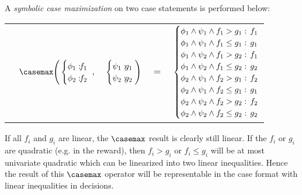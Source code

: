 A \emph{symbolic case maximization} on two case statements is performed below:
\vspace{-4mm}

{\footnotesize
\begin{center}
\begin{tabular}{r c c c l}
&
\hspace{-7mm} $\casemax \Bigg(
  \begin{cases}
    \phi_1: \hspace{-2mm} & \hspace{-2mm} f_1 \\ 
    \phi_2: \hspace{-2mm} & \hspace{-2mm} f_2 \\ 
  \end{cases}$
$,$
&
\hspace{-4mm}
  $\begin{cases}
    \psi_1: \hspace{-2mm} & \hspace{-2mm} g_1 \\ 
    \psi_2: \hspace{-2mm} & \hspace{-2mm} g_2 \\ 
  \end{cases} \Bigg)$
&
\hspace{-4mm} 
$ = $
&
\hspace{-4mm}
  $\begin{cases}
  \phi_1 \wedge \psi_1 \wedge f_1 > g_1    : & \hspace{-2mm} f_1 \\ 
  \phi_1 \wedge \psi_1 \wedge f_1 \leq g_1 : & \hspace{-2mm} g_1 \\ 
  \phi_1 \wedge \psi_2 \wedge f_1 > g_2    : & \hspace{-2mm}f_1 \\ 
  \phi_1 \wedge \psi_2 \wedge f_1 \leq g_2 : & \hspace{-2mm} g_2 \\ 
 \phi_2 \wedge \psi_1 \wedge f_2 > g_1    : & \hspace{-2mm} f_2 \\ 
 \phi_2 \wedge \psi_1 \wedge f_2 \leq g_1 : & \hspace{-2mm} g_1 \\ 
 \phi_2 \wedge \psi_2 \wedge f_2 > g_2    : & \hspace{-2mm} f_2 \\ 
 \phi_2 \wedge \psi_2 \wedge f_2 \leq g_2 : & \hspace{-2mm} g_2 \\ 
  \end{cases}$
\end{tabular}
\end{center}
} If all $f_i$ and $g_i$ are linear,
the $\casemax$ result is clearly still linear.  If the $f_i$ or $g_i$
are quadratic (e.g. in the reward), then $f_i > g_i$ or $f_i \leq
g_i$ will be at most univariate quadratic which can be linearized into two linear inequalities. Hence the result of this $\casemax$
operator will be representable in the case format with linear inequalities in decisions.

